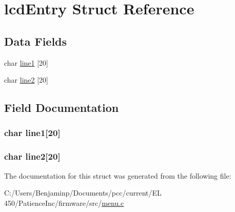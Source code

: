\hypertarget{structlcd_entry}{}\section{lcd\+Entry Struct Reference}
\label{structlcd_entry}
\subsection*{Data Fields}
\begin{DoxyCompactItemize}
\item 
char \hyperlink{structlcd_entry_a8e4e66e1ba151b283b0be689e44cc7fa}{line1} \mbox{[}20\mbox{]}
\item 
char \hyperlink{structlcd_entry_a4f73c55cecd195b3cbd9082903ef5ec8}{line2} \mbox{[}20\mbox{]}
\end{DoxyCompactItemize}


\subsection{Field Documentation}
\hypertarget{structlcd_entry_a8e4e66e1ba151b283b0be689e44cc7fa}{}
\subsubsection[{line1}]{\setlength{\rightskip}{0pt plus 5cm}char line1\mbox{[}20\mbox{]}}\label{structlcd_entry_a8e4e66e1ba151b283b0be689e44cc7fa}
\hypertarget{structlcd_entry_a4f73c55cecd195b3cbd9082903ef5ec8}{}
\subsubsection[{line2}]{\setlength{\rightskip}{0pt plus 5cm}char line2\mbox{[}20\mbox{]}}\label{structlcd_entry_a4f73c55cecd195b3cbd9082903ef5ec8}


The documentation for this struct was generated from the following file\+:\begin{DoxyCompactItemize}
\item 
C\+:/\+Users/\+Benjaminp/\+Documents/pcc/current/\+E\+L 450/\+Patience\+Inc/firmware/src/\hyperlink{menu_8c}{menu.\+c}\end{DoxyCompactItemize}
